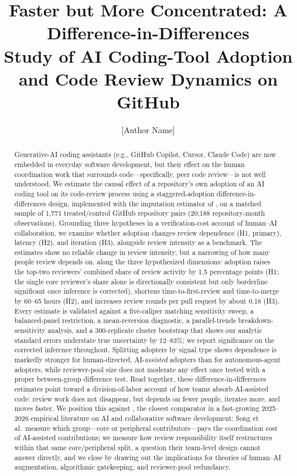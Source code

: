 \documentclass[12pt]{article}
\title{\textbf{Faster but More Concentrated: A Difference-in-Differences\\
Study of AI Coding-Tool Adoption and Code Review Dynamics on GitHub}}
\author[1]{[Author Name]}
\date{}
\begin{document}
\maketitle

\begin{abstract}
\noindent Generative-AI coding assistants (e.g., GitHub Copilot, Cursor,
Claude Code) are now embedded in everyday software development, but their
effect on the human coordination work that surrounds code---specifically,
peer code review---is not well understood. We estimate the causal effect
of a repository's own adoption of an AI coding tool on its code-review
process using a staggered-adoption difference-in-differences design,
implemented with the imputation estimator of
\citet{borusyak2024revisiting}, on a matched sample of 1,771
treated/control GitHub repository pairs (20,188 repository-month
observations). Grounding three hypotheses in a verification-cost account
of human--AI collaboration, we examine whether adoption changes review
dependence (H1, primary), latency (H2), and iteration (H3), alongside
review intensity as a benchmark. The estimates show no reliable change in
review intensity, but a narrowing of how many people review depends on,
along the three hypothesized dimensions: adoption raises the top-two
reviewers' combined share of review activity by 1.5 percentage points
(H1; the single core reviewer's share alone is directionally consistent
but only borderline significant once inference is corrected), shortens
time-to-first-review and time-to-merge by 60--65 hours (H2), and
increases review rounds per pull request by about 0.18 (H3). Every
estimate is validated against a five-caliper matching sensitivity sweep,
a balanced-panel restriction, a mean-reversion diagnostic, a
parallel-trends breakdown-sensitivity analysis, and a 300-replicate
cluster bootstrap that shows our analytic standard errors understate true
uncertainty by 12--83\%; we report significance on the corrected
inference throughout. Splitting adopters by signal type shows dependence
is markedly stronger for human-directed, AI-\emph{assisted} adopters than
for autonomous-agent adopters, while reviewer-pool size does not moderate
any effect once tested with a proper between-group difference test. Read
together, these difference-in-differences estimates point toward a
division-of-labor account of how teams absorb AI-assisted code: review
work does not disappear, but depends on fewer people, iterates more, and
moves faster. We position this against \citet{song2026impact}, the
closest comparator in a fast-growing 2025--2026 empirical literature on
AI and collaborative software development: Song et al.\ measure which
group---core or peripheral contributors---pays the coordination cost of
AI-assisted contributions; we measure how review responsibility itself
restructures within that same core/peripheral split, a question their
team-level design cannot answer directly, and we close by drawing out
the implications for theories of human--AI augmentation, algorithmic
gatekeeping, and reviewer-pool redundancy.
\end{abstract}
\end{document}
